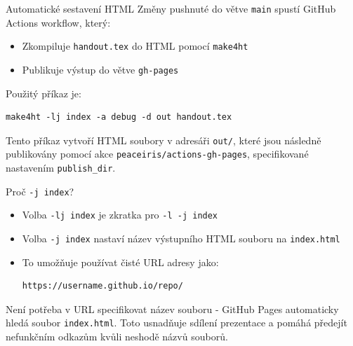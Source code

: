 \begin{frame}[fragile]{Automatické sestavení HTML}
Změny pushnuté do větve \texttt{main} spustí GitHub Actions workflow, který:

\begin{itemize}
\item Zkompiluje \texttt{handout.tex} do HTML pomocí \texttt{make4ht}
\item Publikuje výstup do větve \texttt{gh-pages}
\end{itemize}

Použitý příkaz je:

\begin{verbatim}
make4ht -lj index -a debug -d out handout.tex
\end{verbatim}
\end{frame}

Tento příkaz vytvoří HTML soubory v adresáři \texttt{out/}, které jsou následně publikovány
pomocí akce \texttt{peaceiris/actions-gh-pages}, specifikované nastavením
\texttt{publish_dir}.

\begin{frame}[fragile]{Proč \texttt{-j index}?}
\begin{itemize}
\item Volba \texttt{-lj index} je zkratka pro \texttt{-l -j index}
\item Volba \texttt{-j index} nastaví název výstupního HTML souboru na \texttt{index.html}
\item To umožňuje používat čisté URL adresy jako:

\begin{verbatim}
https://username.github.io/repo/
\end{verbatim}

\end{itemize}
\end{frame}

Není potřeba v URL specifikovat název souboru - GitHub Pages
automaticky hledá soubor \texttt{index.html}. Toto usnadňuje sdílení
prezentace a pomáhá předejít nefunkčním odkazům kvůli neshodě názvů souborů.


